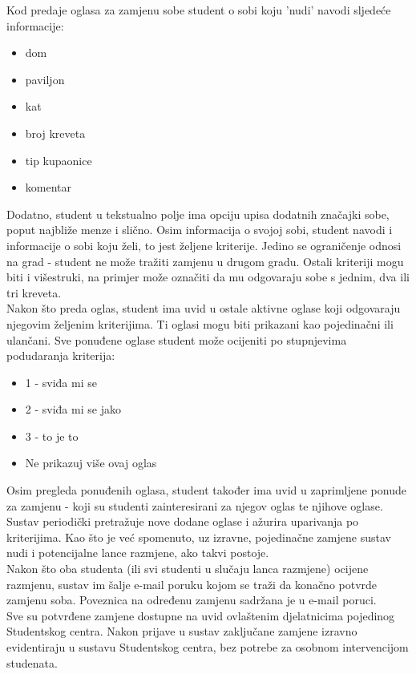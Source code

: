 		Kod predaje oglasa za zamjenu sobe student o sobi koju 'nudi' navodi sljedeće informacije:
		\begin{itemize}
			\item dom
			\item paviljon
			\item kat
			\item broj kreveta 
			\item tip kupaonice
			\item komentar
		\end{itemize}
		Dodatno, student u tekstualno polje ima opciju upisa dodatnih značajki sobe, poput najbliže menze i slično. Osim informacija o svojoj sobi, student navodi i informacije o sobi koju želi, to jest željene kriterije. Jedino se ograničenje odnosi na grad - student ne može tražiti zamjenu u drugom gradu. Ostali kriteriji mogu biti i višestruki, na primjer može označiti da mu odgovaraju sobe s jednim, dva ili tri kreveta.\\
		Nakon što preda oglas, student ima uvid u ostale aktivne oglase koji odgovaraju njegovim željenim kriterijima. Ti oglasi mogu biti prikazani kao pojedinačni ili ulančani. Sve ponuđene oglase student može ocijeniti po stupnjevima podudaranja kriterija:
		\begin{itemize}
			\item 1 - sviđa mi se
			\item 2 - sviđa mi se jako
			\item 3 - to je to
			\item Ne prikazuj više ovaj oglas
		\end{itemize} 
		Osim pregleda ponuđenih oglasa, student također ima uvid u zaprimljene ponude za zamjenu - koji su studenti zainteresirani za njegov oglas te njihove oglase.\\
		Sustav periodički pretražuje nove dodane oglase i ažurira uparivanja po kriterijima. Kao što je već spomenuto, uz izravne, pojedinačne zamjene sustav nudi i potencijalne lance razmjene, ako takvi postoje.\\
		Nakon što oba studenta (ili svi studenti u slučaju lanca razmjene) ocijene razmjenu, sustav im šalje e-mail poruku kojom se traži da konačno potvrde zamjenu soba. Poveznica na određenu zamjenu sadržana je u e-mail poruci. \\
		Sve su potvrđene zamjene dostupne na uvid ovlaštenim djelatnicima pojedinog Studentskog centra. Nakon prijave u sustav zaključane zamjene izravno evidentiraju u sustavu Studentskog centra, bez potrebe za osobnom intervencijom studenata.
		
